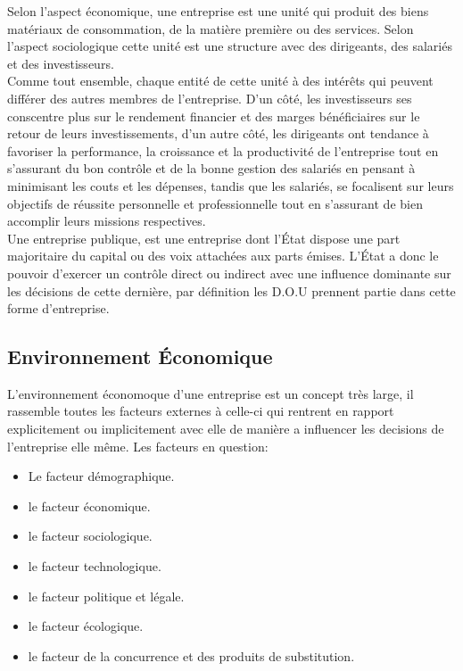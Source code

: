 Selon l'aspect économique, une entreprise est une unité qui produit des biens matériaux de consommation, de la matière première ou des services. Selon l'aspect sociologique cette unité est une structure avec des dirigeants, des salariés et des investisseurs.\\ 

Comme tout ensemble, chaque entité de cette unité à des intérêts qui peuvent différer des autres membres de l'entreprise. D'un côté, les investisseurs ses conscentre plus sur le rendement financier et des marges bénéficiaires sur le retour de leurs investissements, d'un autre côté, les dirigeants ont tendance à favoriser la performance, la croissance et la productivité de l'entreprise tout en s'assurant du bon contrôle et de la bonne gestion des salariés en pensant à minimisant les couts et les dépenses, tandis que les salariés, se focalisent sur leurs objectifs de réussite personnelle et professionnelle tout en s'assurant de bien accomplir leurs missions respectives.\\

Une entreprise publique, est une entreprise dont l'État dispose une part majoritaire du capital ou des voix attachées aux parts émises. L'État a donc le pouvoir d'exercer un contrôle direct ou indirect avec une influence dominante sur les décisions de cette dernière\cite{def-entreprise-pub}, par définition les \acs{D.O.U} prennent partie dans cette forme d'entreprise.\\

\subsection{Environnement Économique}
L'environnement économoque d'une entreprise\cite{env-entreprise} est un concept très large, il rassemble toutes les facteurs externes à celle-ci qui rentrent en rapport explicitement ou implicitement avec elle de manière a influencer les decisions de l'entreprise elle même. Les facteurs en question:\\

\begin{itemize}
    \item Le facteur démographique.
    \item le facteur économique.
    \item le facteur sociologique.
    \item le facteur technologique.
    \item le facteur politique et légale.
    \item le facteur écologique.
    \item le facteur de la concurrence et des produits de substitution.\\
\end{itemize}

